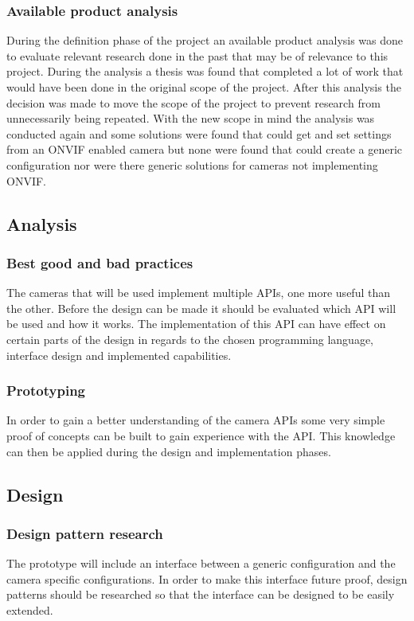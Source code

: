 \documentclass[11pt, a4paper,nomath,nopackage]{siltex-report}
\begin{document}
\subsubsection{Available product analysis}
During the definition phase of the project an available product analysis was done to evaluate relevant research done in the past that may be of relevance to this
project. During the analysis a thesis \cite{tim_k_onvif} was found that completed a lot of work that would have been done in the original scope of the project. After
this analysis the decision was made to move the scope of the project to prevent research from unnecessarily being repeated. With the new scope in mind the analysis was
conducted again and some solutions were found that could get and set settings from an ONVIF enabled camera but none were found that could create a generic configuration nor
were there generic solutions for cameras not implementing ONVIF.

\subsection{Analysis}
\subsubsection{Best good and bad practices}
The cameras that will be used implement multiple APIs, one more useful than the other. Before the design can be made it should be evaluated which API will be used and
how it works. The implementation of this API can have effect on certain parts of the design in regards to the chosen programming language, interface design and
implemented capabilities.

\subsubsection{Prototyping}
In order to gain a better understanding of the camera APIs some very simple proof of concepts can be built to gain experience with the API. This knowledge can then be applied during the design and implementation phases.

\subsection{Design}
\subsubsection{Design pattern research}
The prototype will include an interface between a generic configuration and the camera specific configurations. In order to make this interface future proof, design patterns should be researched so that the interface can be designed to be easily extended.
\end{document}
